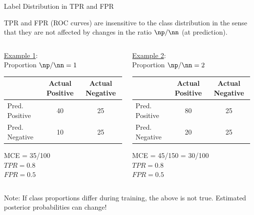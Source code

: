 \documentclass[11pt,compress,t,notes=noshow, xcolor=table]{beamer}
\begin{document}
\begin{vbframe}{Label Distribution in TPR and FPR}

TPR and FPR (ROC curves) are insensitive to the class distribution in the sense that they are not affected by changes in the ratio $\np/\nn$ (at prediction).


\begin{columns}
\begin{column}{0.45\textwidth}

\underline{Example 1}:\\
Proportion $\np/\nn = 1$\\

\lz

{
\tiny
\centering
\tiny
\begin{tabular}{|l|c|c|}
                \hline
               & Actual Positive & Actual Negative \\ \hline
Pred. Positive & 40            & 25            \\ \hline
Pred. Negative & 10            & 25           \\ \hline
\end{tabular}
}
 
\lz 

MCE = 35/100\\
$TPR = 0.8$\\ 
$FPR = 0.5$ 

\end{column}
\begin{column}{0.45\textwidth} 

\underline{Example 2}:\\
Proportion $\np/\nn = 2$\\

\lz

{
\tiny
\begin{tabular}{|l|c|c|}
                \hline
               & Actual Positive & Actual Negative \\ \hline
Pred. Positive & 80            & 25            \\ \hline
Pred. Negative & 20            & 25           \\ \hline
\end{tabular}
}
 
\lz 
 
MCE = 45/150 = 30/100\\
$TPR = 0.8$\\ 
$FPR = 0.5$ 
\end{column}
\end{columns}



\lz

Note: If class proportions differ during training, the above is not true. Estimated posterior probabilities can change!

\end{vbframe}
\end{document}
